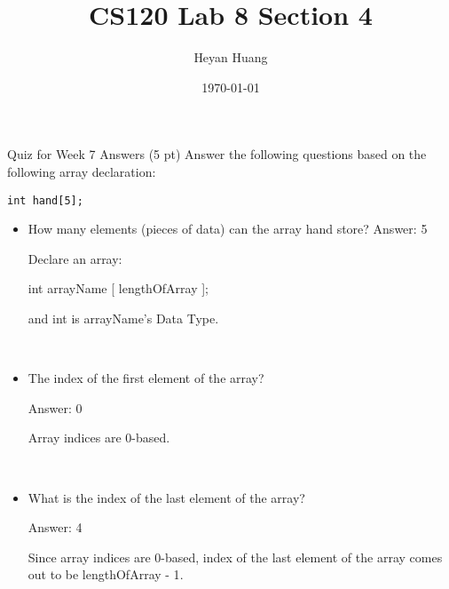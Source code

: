 \documentclass[presentation]{beamer}
\author{Heyan Huang}
\date{\today}
\title{CS120 Lab \alert{8} Section \alert{4}}
\begin{document}
\maketitle

\begin{frame}[fragile,label=sec-1]{Quiz for Week 7 \alert{Answers}}
 (5 pt) Answer the following questions based on the following array declaration:
\begin{verbatim}
int hand[5];
\end{verbatim}
\begin{itemize}
\item How many elements (pieces of data) can the array hand store?
Answer: \alert{5}

\alert{Declare} an array: 

int \alert{arrayName} [ \alert{lengthOfArray} ]; 

and \alert{int} is arrayName's \alert{Data Type}.
\end{itemize}
\\
\begin{itemize}
\item The index of the \alert{first element} of the array?

Answer: \alert{0}

Array indices are \alert{0-based}.
\end{itemize}
\\

\begin{itemize}
\item What is the index of the \alert{last element} of the array?

Answer: \alert{4}

Since array indices are \alert{0-based}, index of the \alert{last} element of the array comes out to be \alert{lengthOfArray - 1}.
\end{itemize}

\\
\end{frame}
\end{document}

